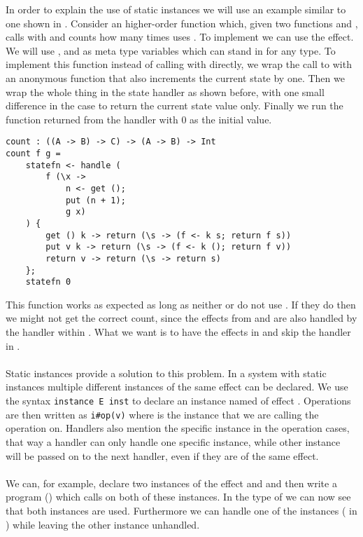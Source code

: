 In order to explain the use of static instances we will use an example similar to one shown in \cite{handlewithcare}.
Consider an higher-order function  which, given two functions  and , calls  with  and counts how many times  uses . To implement  we can use the  effect. We will use ,  and  as meta type variables which can stand in for any type. To implement this function instead of calling  with  directly, we wrap the call to  with an anonymous function that also increments the current state by one. Then we wrap the whole thing in the state handler as shown before, with one small difference in the  case to return the current state value only. Finally we run the function returned from the handler with $0$ as the initial value.

\begin{verbatim}
count : ((A -> B) -> C) -> (A -> B) -> Int
count f g =
	statefn <- handle (
		f (\x ->
			n <- get ();
			put (n + 1);
			g x)
	) {
		get () k -> return (\s -> (f <- k s; return f s))
		put v k -> return (\s -> (f <- k (); return f v))
		return v -> return (\s -> return s)
	};
	statefn 0
\end{verbatim}

This function works as expected as long as neither  or  do not use .
If they do then we might not get the correct count, since the  effects from  and  are also handled by the handler within .
What we want is to have the  effects in  and  skip the handler in .
\\\\
Static instances provide a solution to this problem. In a system with static instances multiple different instances of the same effect can be declared. We use the syntax \texttt{instance E inst} to declare an instance named  of effect .
Operations are then written as \texttt{i#op(v)} where  is the instance that we are calling the operation on.
Handlers also mention the specific instance in the operation cases, that way a handler can only handle one specific instance, while other instance will be passed on to the next handler, even if they are of the same effect.
\\\\
We can, for example, declare two instances of the  effect  and  and then write a program () which calls  on both of these instances. In the type of  we can now see that both instances are used.
Furthermore we can handle one of the instances ( in ) while leaving the other instance  unhandled.

